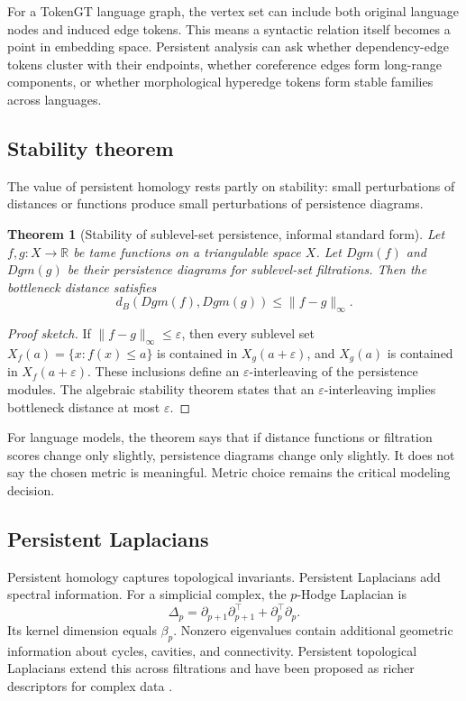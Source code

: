 \documentclass[11pt]{article}
\newtheorem{theorem}[definition]{Theorem}
\newcommand{\R}{\mathbb{R}}
\newcommand{\1}{\mathbf{1}}
\newcommand{\eps}{\varepsilon}
\begin{document}
For a TokenGT language graph, the vertex set can include both original language nodes and induced edge tokens. This means a syntactic relation itself becomes a point in embedding space. Persistent analysis can ask whether dependency-edge tokens cluster with their endpoints, whether coreference edges form long-range components, or whether morphological hyperedge tokens form stable families across languages.

\subsection{Stability theorem}

The value of persistent homology rests partly on stability: small perturbations of distances or functions produce small perturbations of persistence diagrams.

\begin{theorem}[Stability of sublevel-set persistence, informal standard form]
Let $f,g:X\to\R$ be tame functions on a triangulable space $X$. Let $Dgm(f)$ and $Dgm(g)$ be their persistence diagrams for sublevel-set filtrations. Then the bottleneck distance satisfies
\[
d_B(Dgm(f),Dgm(g))\le \|f-g\|_\infty.
\]
\end{theorem}
\begin{proof}[Proof sketch]
If $\|f-g\|_\infty\le\eps$, then every sublevel set $X_f(a)=\{x:f(x)\le a\}$ is contained in $X_g(a+\eps)$, and $X_g(a)$ is contained in $X_f(a+\eps)$. These inclusions define an $\eps$-interleaving of the persistence modules. The algebraic stability theorem states that an $\eps$-interleaving implies bottleneck distance at most $\eps$.
\end{proof}

For language models, the theorem says that if distance functions or filtration scores change only slightly, persistence diagrams change only slightly. It does not say the chosen metric is meaningful. Metric choice remains the critical modeling decision.

\subsection{Persistent Laplacians}

Persistent homology captures topological invariants. Persistent Laplacians add spectral information. For a simplicial complex, the $p$-Hodge Laplacian is
\[
\Delta_p=\partial_{p+1}\partial_{p+1}^\top+\partial_p^\top\partial_p.
\]
Its kernel dimension equals $\beta_p$. Nonzero eigenvalues contain additional geometric information about cycles, cavities, and connectivity. Persistent topological Laplacians extend this across filtrations and have been proposed as richer descriptors for complex data \cite{WeiPersistentLaplacian2023}.
\end{document}
